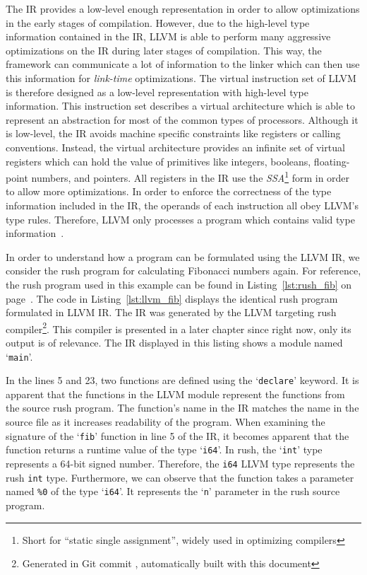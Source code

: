 The IR provides a low-level enough representation in order to allow optimizations in the early stages of compilation.
However, due to the high-level type information contained in the IR,
LLVM is able to perform many aggressive optimizations on the IR during later stages of compilation.
This way, the framework can communicate a lot of information to the linker which can then use this information for \emph{link-time} optimizations.
The virtual instruction set of LLVM is therefore designed as a low-level representation with high-level type information.
This instruction set describes a virtual architecture which is able to represent an abstraction for most of the common types of processors.
Although it is low-level, the IR avoids machine specific constraints like registers or calling conventions.
Instead, the virtual architecture provides an infinite set of virtual registers which can hold the value of primitives like integers, booleans, floating-point numbers, and pointers.
All registers in the IR use the \emph{SSA}\footnote{Short for \enquote{static single assignment}, widely used in optimizing compilers} form in order to allow more optimizations.
In order to enforce the correctness of the type information included in the IR, the operands of each instruction all obey LLVM's type rules.
Therefore, LLVM only processes a program which contains valid type information~\cite[p.~14-17]{Lattner:MSThesis02}.

In order to understand how a program can be formulated using the LLVM IR, we consider the rush program for calculating Fibonacci numbers again.
For reference, the rush program used in this example can be found in Listing~\ref{lst:rush_fib} on page~\pageref{lst:rush_fib}.
The code in Listing~\ref{lst:llvm_fib} displays the identical rush program formulated in LLVM IR\@.
The IR was generated by the LLVM targeting rush compiler\footnote{Generated in Git commit \rushCommit, automatically built with this document}.
This compiler is presented in a later chapter since right now, only its output is of relevance.
The IR displayed in this listing shows a module named `\texttt{main}'.


In the lines 5 and 23, two functions are defined using the `\texttt{declare}' keyword.
It is apparent that the functions in the LLVM module represent the functions from the source rush program.
The function's name in the IR matches the name in the source file as it increases readability of the program.
When examining the signature of the `\texttt{fib}' function in line 5 of the IR,
it becomes apparent that the function returns a runtime value of the type `\texttt{i64}'.
In rush, the `\texttt{int}' type represents a 64-bit signed number.
Therefore, the \texttt{i64} LLVM type represents the rush \texttt{int} type.
Furthermore, we can observe that the function takes a parameter named \texttt{\%0} of the type `\texttt{i64}'.
It represents the `\texttt{n}' parameter in the rush source program.

